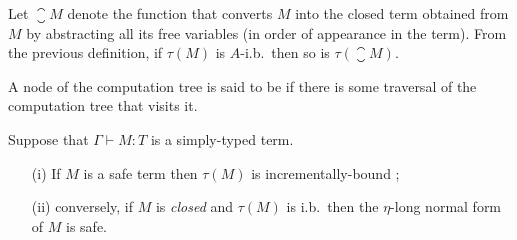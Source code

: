 \smallskip

Let $\closure{M}$ denote the function that converts $M$ into the
closed term obtained from $M$ by abstracting all its free variables
(in order of appearance in the term). From the previous definition,
if $\tau(M)$ is $A$-i.b.\ then so is $\tau(\closure{M})$.

\smallskip

A node of the computation tree is said to be  if
there is some traversal of the computation tree that visits it.


\begin{lemma}
\label{lem:incrbound_iff_etanf_safe} Suppose that  $\Gamma \vdash M
:T$ is a simply-typed term.
\begin{itemize}
\item[(i)] If $M$ is a safe term then $\tau(M)$ is incrementally-bound ;
\item[(ii)] conversely, if $M$ is \emph{closed} and $\tau(M)$ is i.b.\ then the $\eta$-long normal form of $M$ is safe.
\end{itemize}
\end{lemma}
